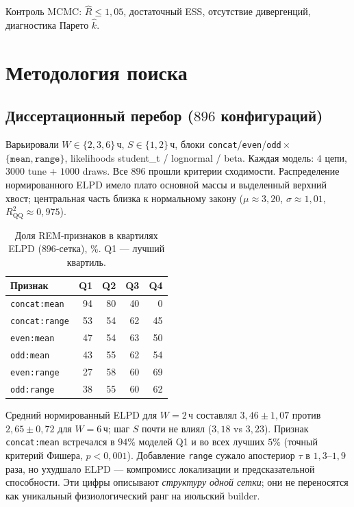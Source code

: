 \documentclass{article}
\begin{document}
Контроль MCMC: $\hat R\le 1{,}05$, достаточный ESS, отсутствие
дивергенций, диагностика Парето $\hat k$.

\section{Методология поиска}

\subsection{Диссертационный перебор ($896$ конфигураций)}

Варьировали $W\in\{2,3,6\}$\,ч, $S\in\{1,2\}$\,ч, блоки
\texttt{concat}/\texttt{even}/\texttt{odd}${}\times{}$
$\{\texttt{mean},\texttt{range}\}$, likelihoods student\_t / lognormal /
beta. Каждая модель: $4$ цепи, $3000$ tune + $1000$ draws. Все
$896$ прошли критерии сходимости. Распределение нормированного ELPD
имело плато основной массы и выделенный верхний хвост; центральная
часть близка к нормальному закону ($\mu\approx 3{,}20$,
$\sigma\approx 1{,}01$, $R^2_{\mathrm{QQ}}\approx 0{,}975$).

\begin{table}[t]
\centering
\caption{Доля REM-признаков в квартилях ELPD ($896$-сетка), \%.
Q1 --- лучший квартиль.}
\label{tab:feat-q}
\small
\begin{tabular}{lrrrr}
\toprule
Признак & Q1 & Q2 & Q3 & Q4\\
\midrule
\texttt{concat:mean}  & 94 & 80 & 40 & 0\\
\texttt{concat:range} & 53 & 54 & 62 & 45\\
\texttt{even:mean}    & 47 & 54 & 63 & 50\\
\texttt{odd:mean}     & 43 & 55 & 62 & 54\\
\texttt{even:range}   & 27 & 58 & 60 & 69\\
\texttt{odd:range}    & 38 & 55 & 60 & 62\\
\bottomrule
\end{tabular}
\end{table}

Средний нормированный ELPD для $W{=}2$\,ч составлял
$3{,}46\pm1{,}07$ против $2{,}65\pm0{,}72$ для $W{=}6$\,ч; шаг $S$
почти не влиял ($3{,}18$ vs $3{,}23$). Признак \texttt{concat:mean}
встречался в $94\%$ моделей Q1 и во всех лучших $5\%$ (точный критерий
Фишера, $p<0{,}001$). Добавление \texttt{range} сужало апостериор
$\tau$ в $1{,}3$--$1{,}9$ раза, но ухудшало ELPD --- компромисс
локализации и предсказательной способности. Эти цифры описывают
\emph{структуру одной сетки}; они не переносятся как уникальный
физиологический ранг на июльский builder.
\end{document}
